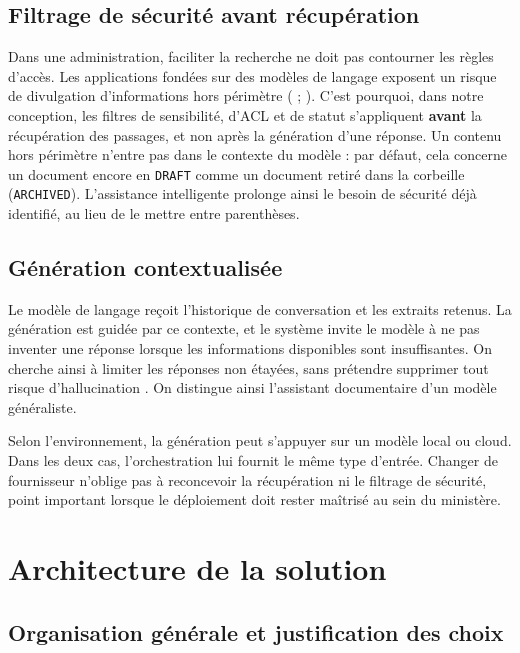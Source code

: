 \subsection{Filtrage de sécurité avant récupération}

Dans une administration, faciliter la recherche ne doit pas contourner les règles d'accès. Les applications fondées sur des modèles de langage exposent un risque de divulgation d'informations hors périmètre ( ; ). C'est pourquoi, dans notre conception, les filtres de sensibilité, d'ACL et de statut s'appliquent \textbf{avant} la récupération des passages, et non après la génération d'une réponse. Un contenu hors périmètre n'entre pas dans le contexte du modèle : par défaut, cela concerne un document encore en \texttt{DRAFT} comme un document retiré dans la corbeille (\texttt{ARCHIVED}). L'assistance intelligente prolonge ainsi le besoin de sécurité déjà identifié, au lieu de le mettre entre parenthèses.

\subsection{Génération contextualisée}

Le modèle de langage reçoit l'historique de conversation et les extraits retenus. La génération est guidée par ce contexte, et le système invite le modèle à ne pas inventer une réponse lorsque les informations disponibles sont insuffisantes. On cherche ainsi à limiter les réponses non étayées, sans prétendre supprimer tout risque d'hallucination . On distingue ainsi l'assistant documentaire d'un modèle généraliste.

Selon l'environnement, la génération peut s'appuyer sur un modèle local ou cloud. Dans les deux cas, l'orchestration lui fournit le même type d'entrée. Changer de fournisseur n'oblige pas à reconcevoir la récupération ni le filtrage de sécurité, point important lorsque le déploiement doit rester maîtrisé au sein du ministère.

\section{Architecture de la solution}

\subsection{Organisation générale et justification des choix}

